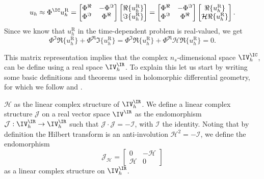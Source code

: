 \begin{equation} \label{eq:real-matrixform}
    u_h \approx \Phi^\IC u_h^{\textrm{R}} =
    \begin{bmatrix}
        \Phi^\Re & -\Phi^\Im \\
        \Phi^\Im & \Phi^\Re
    \end{bmatrix}
    \begin{bmatrix}
        \Re \{ u_h^{\textrm{R}} \}  \\
        \Im \{ u_h^{\textrm{R}} \}
    \end{bmatrix} =
    \begin{bmatrix}
        \Phi^\Re & -\Phi^\Im \\
        \Phi^\Im & \Phi^\Re
    \end{bmatrix}
    \begin{bmatrix}
        \Re \{ u_h^{\textrm{R}} \}  \\
        \mathcal{H} \Re \{ u_h^{\textrm{R}} \}
    \end{bmatrix}.
\end{equation}
Since we know that $u_h^{\textrm{R}}$ in the time-dependent problem is real-valued, we get
\begin{equation} \label{eq:realfromcomplex}
    \Phi^\Im \Re \{ u_h^{\textrm{R}} \} + \Phi^\Re \Im \{ u_h^{\textrm{R}} \} = \Phi^\Im \Re \{ u_h^{\textrm{R}} \} + \Phi^\Re \mathcal{H} \Re \{ u_h^{\textrm{R}} \} = 0.
\end{equation}

This matrix representation implies that the complex $n_s$-dimensional space $\IV^\IC_h$, can be define using a real space $\IV^\IR_h$. To explain this let us start by writing some basic definitions and theorems used in holomorphic differential geometry, for which we follow \cite[chapter~4]{lewisNotesGlobalAnalysis} and \cite{maninLinearAlgebraGeometry1989}.
\begin{definition} {$\mathcal{H}$ as the linear complex structure of $\IV_h^\IR$.}
    We define a linear complex structure $\mathcal{J}$ on a real vector space $\IV^\IR$ as the endomorphism $\mathcal{J}: \IV_h^\IR \to \IV_h^\IR$ such that $\mathcal{J} \cdot \mathcal{J} =- \mathcal{I}$, with $\mathcal{I}$ the identity.
    Noting that by definition the Hilbert transform is an anti-involution $\mathcal{H}^2 = -\mathcal{I}$, we define the endomorphism
\begin{equation} \label{eq:J-complex}
    \mathcal{J}_{\mathcal{H}} = 
    \begin{bmatrix}
        0 & -\mathcal{H} \\
        \mathcal{H} & 0
    \end{bmatrix}
\end{equation}
as a linear complex structure on $\IV_h^\IR$.
\end{definition}



